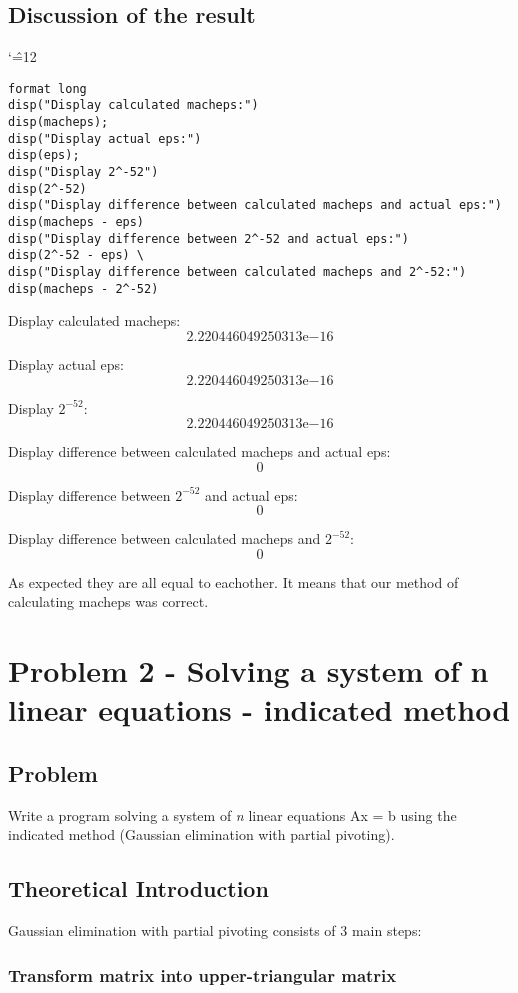 \documentclass{report}
\newenvironment{simplechar}{%
   \catcode`\^=12
}{}
\begin{document}
\section{Discussion of the result}
\begin{simplechar}
\begin{lstlisting}
format long
disp("Display calculated macheps:")
disp(macheps);
disp("Display actual eps:")
disp(eps);
disp("Display 2^-52")
disp(2^-52)
disp("Display difference between calculated macheps and actual eps:")
disp(macheps - eps)
disp("Display difference between 2^-52 and actual eps:")
disp(2^-52 - eps) \
disp("Display difference between calculated macheps and 2^-52:")
disp(macheps - 2^-52)
\end{lstlisting}
\end{simplechar}
Display calculated macheps:
     \[2.220446049250313\mathrm{e}{-16}\]

Display actual eps:
     \[2.220446049250313\mathrm{e}{-16}\]

Display $2^{-52}$:
     \[2.220446049250313\mathrm{e}{-16}\]

Display difference between calculated macheps and actual eps:
     \[0\]

Display difference between $2^{-52}$ and actual eps:
          \[0\]

Display difference between calculated macheps and $2^{-52}$:
         \[0\]

As expected they are all equal to eachother. It means that our method of calculating macheps was correct.

\chapter{Problem 2 - Solving a system of n linear equations - indicated method}

\section{Problem}
Write a program solving a system of \textit{n} linear equations Ax = b using the indicated method (Gaussian elimination with partial pivoting).

\section{Theoretical Introduction}
Gaussian elimination with partial pivoting consists of 3 main steps:
\subsection{Transform matrix into upper-triangular matrix}
\end{document}
